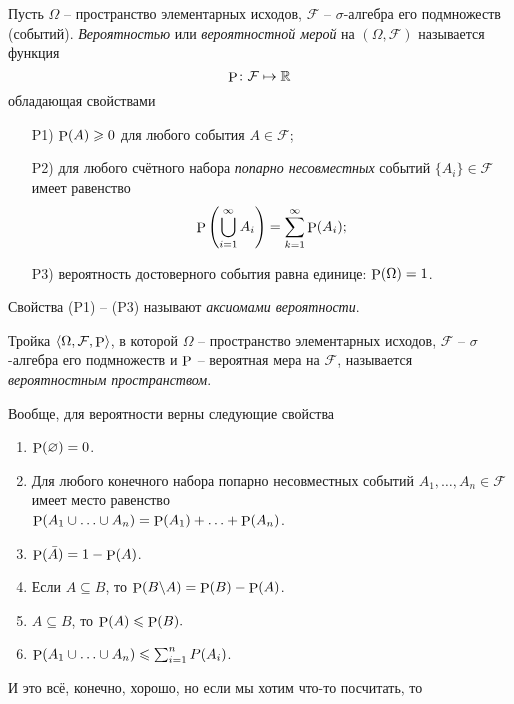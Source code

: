 \begin{to_def}
    Пусть $\Omega$ -- пространство элементарных исходов, $\mathcal F$ -- $\sigma$-алгебра его подмножеств (событий). \textit{Вероятностью} или \textit{вероятностной мерой} на $(\Omega, \mathcal F)$ называется функция 
    \begin{equation*}
        \P \colon  \mathcal F \mapsto \mathbb{R}
    \end{equation*}
    обладающая свойствами
    \begin{itemize}
        \item[P1)] $\P (A) \geq 0$ для любого события $A \in \mathcal F$;
        \item[P2)] для любого счётного набора \textit{попарно несовместных} событий $\{A_i\} \in \mathcal F$ имеет равенство
        \begin{equation*}
            \P \left(
                \bigcup_{i=1}^{\infty} A_i
            \right) = \sum_{k=1}^{\infty} \P (A_i);
        \end{equation*}
        \item[P3)] вероятность достоверного события равна единице: $\P(\Omega) = 1$.
    \end{itemize}
\end{to_def}

Свойства (P1) -- (P3) называют \textit{аксиомами вероятности}.

\begin{to_def}
    Тройка $\langle \Omega, \mathcal F, \P \rangle$, в которой $\Omega$ -- пространство элементарных исходов, $\mathcal F$ -- $\sigma$-алгебра его подмножеств и $\P$ -- вероятная мера на $\mathcal F$, называется \textit{вероятностным пространством}. 
\end{to_def}

Вообще, для вероятности верны следующие свойства
\begin{enumerate}
    \item $\P(\varnothing) = 0$.
    \item Для любого конечного набора попарно несовместных событий $A_1, \ldots, A_n \in \mathcal F$ имеет место равенство \\ $\P(A_1 \cup \ldots \cup A_n) = \P(A_1) + \ldots + \P(A_n)$.
    \item $\P (\bar{A}) = 1 - \P(A)$.
    \item Если $A \subseteq B$, то $\P(B \backslash A) = \P(B) - \P(A)$.
    \item $A \subseteq B$, то $\P(A) \leq \P(B).$
    \item $\P(A_1 \cup \ldots \cup A_n) \leq \sum_{i=1}^n P(A_i)$.
\end{enumerate}
И это всё, конечно, хорошо, но если мы хотим что-то посчитать, то

